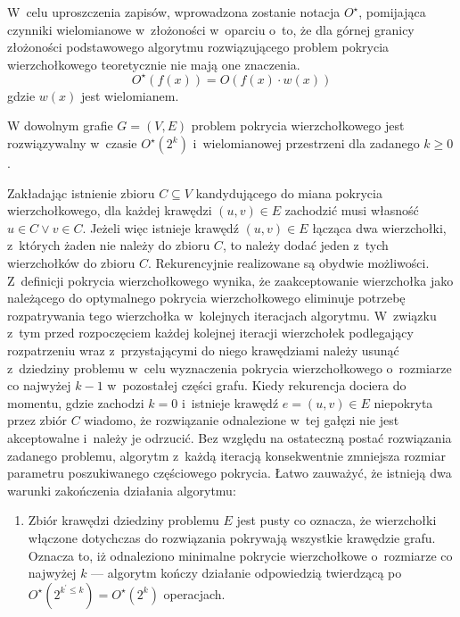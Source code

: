 \par{
  W~celu uproszczenia zapisów, wprowadzona zostanie notacja $O^{\star}$, pomijająca czynniki wielomianowe w~złożoności w~oparciu o~to, że dla górnej granicy złożoności podstawowego algorytmu rozwiązującego problem pokrycia wierzchołkowego teoretycznie nie mają one znaczenia.
  \begin{equation*}
    O^{\star}(f(x))=O(f(x) \cdot w(x))
  \end{equation*}
  gdzie $w(x)$ jest wielomianem.

  \begin{theorem}
    W dowolnym grafie $G=(V, E)$ problem pokrycia wierzchołkowego jest rozwiązywalny w~czasie $O^{\star}(2^k)$ i~wielomianowej przestrzeni dla zadanego $k \geq 0$.
  \end{theorem}
  \begin{bproof}
    Zakładając istnienie zbioru $C \subseteq V$ kandydującego do miana pokrycia wierzchołkowego, dla każdej krawędzi $(u, v) \in E$ zachodzić musi własność  $u \in C \lor v \in C$.
    Jeżeli więc istnieje krawędź $(u, v) \in E$ łącząca dwa wierzchołki, z~których żaden nie należy do zbioru $C$, to należy dodać jeden z~tych wierzchołków do zbioru $C$.
    Rekurencyjnie realizowane są obydwie możliwości.
    Z~definicji pokrycia wierzchołkowego wynika, że zaakceptowanie wierzchołka jako należącego do optymalnego pokrycia wierzchołkowego eliminuje potrzebę rozpatrywania tego wierzchołka w~kolejnych iteracjach algorytmu.
    W~związku z~tym przed rozpoczęciem każdej kolejnej iteracji wierzchołek podlegający rozpatrzeniu wraz z~przystającymi do niego krawędziami należy usunąć z~dziedziny problemu w~celu wyznaczenia pokrycia wierzchołkowego o~rozmiarze co najwyżej $k-1$ w~pozostałej części grafu.
    Kiedy rekurencja dociera do momentu, gdzie zachodzi $k=0$ i~istnieje krawędź $e=(u,v) \in E$ niepokryta przez zbiór $C$ wiadomo, że rozwiązanie odnalezione w~tej gałęzi nie jest akceptowalne i~należy je odrzucić.
    Bez względu na ostateczną postać rozwiązania zadanego problemu, algorytm z~każdą iteracją konsekwentnie zmniejsza rozmiar parametru poszukiwanego częściowego pokrycia.
    Łatwo zauważyć, że istnieją dwa warunki zakończenia działania algorytmu:
    \begin{enumerate}
      \item Zbiór krawędzi dziedziny problemu $E$ jest pusty co oznacza, że wierzchołki włączone dotychczas do rozwiązania pokrywają wszystkie krawędzie grafu.
      Oznacza to, iż odnaleziono minimalne pokrycie wierzchołkowe o~rozmiarze co najwyżej $k$ --- algorytm kończy działanie odpowiedzią twierdzącą po $O^\star(2^{k^\prime \leq k})=O^\star(2^k)$ operacjach.

\end{enumerate}
\end{bproof}}
